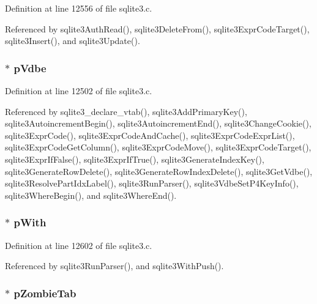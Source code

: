 Definition at line 12556 of file sqlite3.\+c.



Referenced by sqlite3\+Auth\+Read(), sqlite3\+Delete\+From(), sqlite3\+Expr\+Code\+Target(), sqlite3\+Insert(), and sqlite3\+Update().

\hypertarget{struct_parse_ac73302f0c912cb7b3c9b1cea509e6077}{}
\subsubsection[{p\+Vdbe}]{$\ast$ p\+Vdbe}\label{struct_parse_ac73302f0c912cb7b3c9b1cea509e6077}


Definition at line 12502 of file sqlite3.\+c.



Referenced by sqlite3\+\_\+declare\+\_\+vtab(), sqlite3\+Add\+Primary\+Key(), sqlite3\+Autoincrement\+Begin(), sqlite3\+Autoincrement\+End(), sqlite3\+Change\+Cookie(), sqlite3\+Expr\+Code(), sqlite3\+Expr\+Code\+And\+Cache(), sqlite3\+Expr\+Code\+Expr\+List(), sqlite3\+Expr\+Code\+Get\+Column(), sqlite3\+Expr\+Code\+Move(), sqlite3\+Expr\+Code\+Target(), sqlite3\+Expr\+If\+False(), sqlite3\+Expr\+If\+True(), sqlite3\+Generate\+Index\+Key(), sqlite3\+Generate\+Row\+Delete(), sqlite3\+Generate\+Row\+Index\+Delete(), sqlite3\+Get\+Vdbe(), sqlite3\+Resolve\+Part\+Idx\+Label(), sqlite3\+Run\+Parser(), sqlite3\+Vdbe\+Set\+P4\+Key\+Info(), sqlite3\+Where\+Begin(), and sqlite3\+Where\+End().

\hypertarget{struct_parse_a49014e0850234bf861fd5de6ea610b7e}{}
\subsubsection[{p\+With}]{$\ast$ p\+With}\label{struct_parse_a49014e0850234bf861fd5de6ea610b7e}


Definition at line 12602 of file sqlite3.\+c.



Referenced by sqlite3\+Run\+Parser(), and sqlite3\+With\+Push().

\hypertarget{struct_parse_a47daa61bd1c950512bbd9d55da0dc59b}{}
\subsubsection[{p\+Zombie\+Tab}]{$\ast$ p\+Zombie\+Tab}\label{struct_parse_a47daa61bd1c950512bbd9d55da0dc59b}


